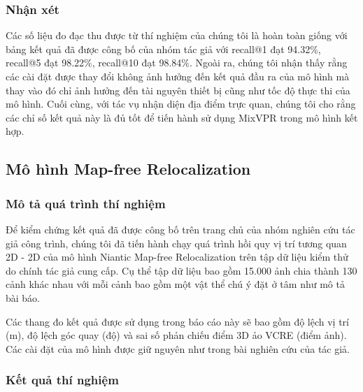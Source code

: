 \subsubsection*{Nhận xét}

Các số liệu đo đạc thu được từ thí nghiệm của chúng tôi là hoàn toàn giống với bảng kết quả đã được công bố của nhóm tác giả với recall@1 đạt 94.32\%, recall@5 đạt 98.22\%, recall@10 đạt 98.84\%. Ngoài ra, chúng tôi nhận thấy rằng các cài đặt được thay đổi không ảnh hưởng đến kết quả đầu ra của mô hình mà thay vào đó chỉ ảnh hưởng đến tài nguyên thiết bị cũng như tốc độ thực thi của mô hình. Cuối cùng, với tác vụ nhận diện địa điểm trực quan, chúng tôi cho rằng các chỉ số kết quả này là đủ tốt để tiến hành sử dụng MixVPR trong mô hình kết hợp.

\subsection{Mô hình Map-free Relocalization}
\subsubsection*{Mô tả quá trình thí nghiệm}

Để kiểm chứng kết quả đã được công bố trên trang chủ của nhóm nghiên cứu tác giả công trình, chúng tôi đã tiến hành chạy quá trình hồi quy vị trí tương quan 2D - 2D của mô hình Niantic Map-free Relocalization trên tập dữ liệu kiểm thử do chính tác giả cung cấp. Cụ thể tập dữ liệu bao gồm 15.000 ảnh chia thành 130 cảnh khác nhau với mỗi cảnh bao gồm một vật thể chú ý đặt ở tâm như mô tả bài báo.

Các thang đo kết quả được sử dụng trong báo cáo này sẽ bao gồm độ lệch vị trí (m), độ lệch góc quay (độ) và sai số phản chiếu điểm 3D ảo VCRE (điểm ảnh). Các cài đặt của mô hình được giữ nguyên như trong bài nghiên cứu của tác giả.

\subsubsection*{Kết quả thí nghiệm}

